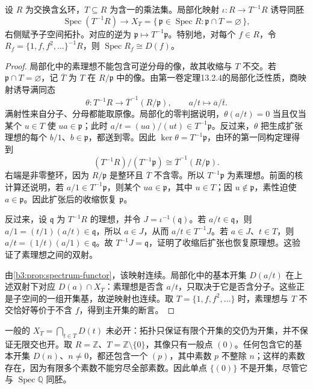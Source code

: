 \begin{theorem}\label{b3:thm:spec-localization}
	设 \(R\) 为交换含幺环，\(T\subseteq R\) 为含一的乘法集。局部化映射 \(\iota:R\rightarrow T^{-1}R\) 诱导同胚
	\[
		\operatorname{Spec}(T^{-1}R)\longrightarrow X_T=\{\,\mathfrak p\in\operatorname{Spec}R:\mathfrak p\cap T=\varnothing\,\},
	\]
	右侧赋予子空间拓扑。对应的逆为 \(\mathfrak p\mapsto T^{-1}\mathfrak p\)。特别地，对每个 \(f\in R\)，令 \(R_f=\{1,f,f^2,\ldots\}^{-1}R\)，则 \(\operatorname{Spec}R_f\cong D(f)\)。
\end{theorem}
\begin{proof}
	局部化中的素理想不能包含可逆分母的像，故其收缩与 \(T\) 不交。若 \(\mathfrak p\cap T=\varnothing\)，记 \(\overline T\) 为 \(T\) 在 \(R/\mathfrak p\) 中的像。由第一卷定理13.2.4的局部化泛性质，商映射诱导满同态
	\[
		\theta:T^{-1}R\longrightarrow\overline T^{-1}(R/\mathfrak p), \qquad a/t\longmapsto\overline a/\overline t.
	\]
	满射性来自分子、分母都能取原像。局部化的零判据说明，\(\theta(a/t)=0\) 当且仅当某个 \(u\in T\) 使 \(ua\in\mathfrak p\)；此时 \(a/t=(ua)/(ut)\in T^{-1}\mathfrak p\)。反过来，\(\theta\) 把生成扩张理想的每个 \(b/1\)、\(b\in\mathfrak p\)，都送到零。因此 \(\ker\theta=T^{-1}\mathfrak p\)，由环的第一同构定理得到
	\[
		(T^{-1}R)/(T^{-1}\mathfrak p)\cong\overline T^{-1}(R/\mathfrak p).
	\]
	右端是非零整环，因为 \(R/\mathfrak p\) 是整环且 \(\overline T\) 不含零。所以 \(T^{-1}\mathfrak p\) 为素理想。前面的核计算还说明，若 \(a/1\in T^{-1}\mathfrak p\)，则某个 \(ua\in\mathfrak p\)，其中 \(u\in T\)；因 \(u\notin\mathfrak p\)，素性迫使 \(a\in\mathfrak p\)。因此扩张后的收缩恢复 \(\mathfrak p\)。

	反过来，设 \(\mathfrak q\) 为 \(T^{-1}R\) 的理想，并令 \(J=\iota^{-1}(\mathfrak q)\)。若 \(a/t\in\mathfrak q\)，则 \(a/1=(t/1)(a/t)\in\mathfrak q\)，所以 \(a\in J\)，从而 \(a/t\in T^{-1}J\)。若 \(a\in J\)、\(t\in T\)，则 \(a/t=(1/t)(a/1)\in\mathfrak q\)。故 \(T^{-1}J=\mathfrak q\)，证明了收缩后扩张也恢复原理想。这验证了素理想之间的双射。

	由\cref{b3:prop:spectrum-functor}，该映射连续。局部化中的基本开集 \(D(a/t)\) 在上述双射下对应 \(D(a)\cap X_T\)：素理想是否含 \(a/t\)，只取决于它是否含分子。这些正是子空间的一组开集基，故逆映射也连续。取 \(T=\{1,f,f^2,\ldots\}\) 时，素理想与 \(T\) 不交恰好等价于不含 \(f\)，得到主开集的断言。
\end{proof}

一般的 \(X_T=\bigcap_{t\in T}D(t)\) 未必开：拓扑只保证有限个开集的交仍为开集，并不保证无限交也开。取 \(R=\mathbb Z\)、\(T=\mathbb Z\setminus\{0\}\)，其像只有一般点 \((0)\)。任何包含它的基本开集 \(D(n)\)、\(n\ne0\)，都还包含一个 \((p)\)，其中素数 \(p\) 不整除 \(n\)；这样的素数存在，因为有限多个素数不能穷尽全部素数。因此单点 \(\bigl\{(0)\bigr\}\) 不是开集，尽管它与 \(\operatorname{Spec}\mathbb Q\) 同胚。


